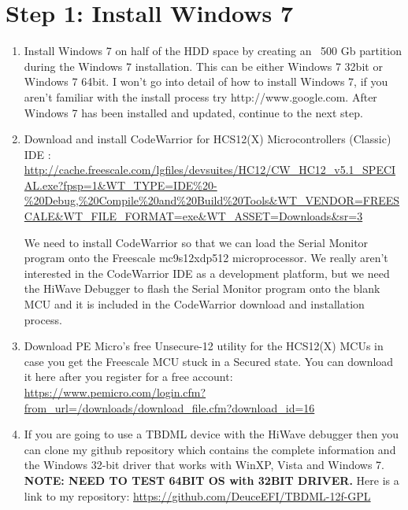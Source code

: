 \documentclass[12pt,notitlepage,onecolumn,oneside,openany,draft]{memoir}
\begin{document}
\chapter{\textsf{Step 1:  Install Windows 7}}
\begin{enumerate}
\item \textsf{Install Windows 7 on half of the HDD space by creating an ~500 Gb partition during the Windows 7 installation.}
\textsf{This can be either Windows 7 32bit or Windows 7 64bit.  I won't go into detail of how to install Windows 7, if you aren't familiar with the install process try http://www.google.com.  After Windows 7 has been installed and updated, continue to the next step.}

\item \textsf{Download and install CodeWarrior for HCS12(X) Microcontrollers (Classic) IDE :} \newline
\url{http://cache.freescale.com/lgfiles/devsuites/HC12/CW_HC12_v5.1_SPECIAL.exe?fpsp=1&WT_TYPE=IDE%20-%20Debug,%20Compile%20and%20Build%20Tools&WT_VENDOR=FREESCALE&WT_FILE_FORMAT=exe&WT_ASSET=Downloads&sr=3}
\newline

\textsf{We need to install CodeWarrior so that we can load the Serial Monitor program onto the Freescale mc9s12xdp512 microprocessor.  We really aren't interested in the CodeWarrior IDE as a development platform, but we need the HiWave Debugger to flash the Serial Monitor program onto the blank MCU and it is included in the CodeWarrior download and installation process.}

\item \textsf{Download PE Micro's free Unsecure-12 utility for the HCS12(X) MCUs in case you get the Freescale MCU stuck in a Secured state. You can download it here after you register for a free account:} \newline
\url{https://www.pemicro.com/login.cfm?from_url=/downloads/download_file.cfm?download_id=16}

\item \textsf{If you are going to use a TBDML device with the HiWave debugger then you can clone my github repository which contains the complete information and the Windows 32-bit driver that works with WinXP, Vista and Windows 7. \textbf{NOTE: NEED TO TEST 64BIT OS with 32BIT DRIVER.}}
\newline 
\textsf{Here is a link to my repository:} \newline
\url{https://github.com/DeuceEFI/TBDML-12f-GPL}


\end{enumerate}
\end{document}
